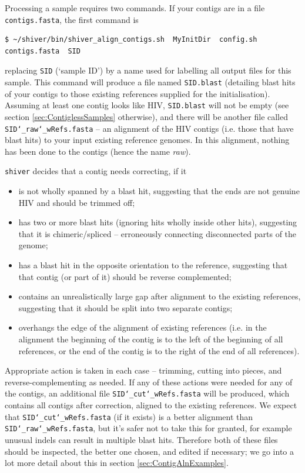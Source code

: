 \documentclass{article}
\newcommand{\shiv}{\c{shiver}\xspace}
\let\c\texttt
\begin{document}
Processing a sample requires two commands.
If your contigs are in a file \c{contigs.fasta}, the first command is  
\begin{Verbatim}[samepage=true]
$ ~/shiver/bin/shiver_align_contigs.sh  MyInitDir  config.sh  contigs.fasta  SID
\end{Verbatim}
replacing \c{SID} (`sample ID') by a name used for labelling all output files for this sample.
This command will produce a file named \c{SID.blast} (detailing blast hits of your contigs to those existing references supplied for the initialisation).
Assuming at least one contig looks like HIV, \c{SID.blast} will not be empty (see section \ref{sec:ContiglessSamples} otherwise), and there will be another file called \c{SID\char`_raw\char`_wRefs.fasta} -- an alignment of the HIV contigs (i.e. those that have blast hits) to your input existing reference genomes.
In this alignment, nothing has been done to the contigs (hence the name {\it raw}).

\shiv decides that a contig needs correcting, if it
\begin{itemize}
 \item is not wholly spanned by a blast hit, suggesting that the ends are not genuine HIV and should be trimmed off;
 \item has two or more blast hits (ignoring hits wholly inside other hits), suggesting that it is chimeric/spliced -- erroneously connecting disconnected parts of the genome;
 \item has a blast hit in the opposite orientation to the reference, suggesting that that contig (or part of it) should be reverse complemented;
 \item contains an unrealistically large gap after alignment to the existing references, suggesting that it should be split into two separate contigs;
 \item overhangs the edge of the alignment of existing references (i.e. in the alignment the beginning of the contig is to the left of the beginning of all references, or the end of the contig is to the right of the end of all references).
\end{itemize}
Appropriate action is taken in each case -- trimming, cutting into pieces, and reverse-complementing as needed.
If any of these actions were needed for any of the contigs, an additional file \c{SID\char`_cut\char`_wRefs.fasta} will be produced, which contains all contigs after correction, aligned to the existing references.
We expect that \c{SID\char`_cut\char`_wRefs.fasta} (if it exists) is a better alignment than \c{SID\char`_raw\char`_wRefs.fasta}, but it's safer not to take this for granted, for example unusual indels can result in multiple blast hits.
Therefore both of these files should be inspected, the better one chosen, and edited if necessary; we go into a lot more detail about this in section \ref{sec:ContigAlnExamples}.
\end{document}
